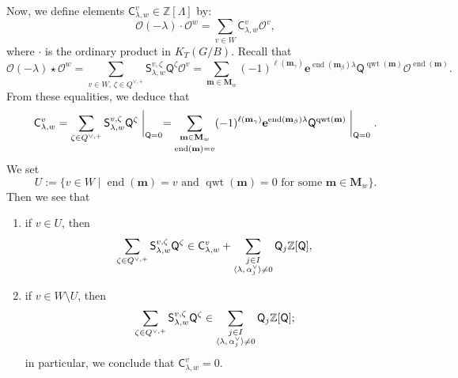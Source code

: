 \documentclass[11pt,a4paper,reqno,dvipdfmx]{amsart}
\numberwithin{equation}{section}
\newcommand{\BZ}{\mathbb{Z}}
\newcommand{\CO}{\mathcal{O}}
\newcommand{\sQ}{\mathsf{Q}}
\newcommand{\sS}{\mathsf{S}}
\newcommand{\sC}{\mathsf{C}}
\newcommand{\be}{\mathbf{e}}
\newcommand{\bm}{\mathbf{m}}
\newcommand{\bM}{\mathbf{M}}
\DeclareMathOperator{\qwt}{qwt}
\DeclareMathOperator{\ed}{end}
\newcommand{\pair}[2]{\langle #1,\,#2 \rangle}
\theoremstyle{plain}
\theoremstyle{definition}
\theoremstyle{remark}
\begin{document}
Now, we define elements $\sC_{\lambda,w}^{v} \in \BZ[\Lambda]$ by: 
%
\begin{equation}
\CO(- \lambda) \cdot \CO^{w} = 
\sum_{v \in W} \sC_{\lambda,w}^{v} \CO^{v},
\end{equation}
%
where $\cdot$ is the ordinary product in $K_{T}(G/B)$. 
Recall that 
%
\begin{equation*}
\CO(- \lambda) \star \CO^{w} = \sum_{v \in W,\,\zeta \in Q^{\vee,+} }
\sS_{\lambda,w}^{v,\zeta} \sQ^{\zeta} \CO^{v} = 
\sum_{\bm \in \bM_{w}}
  (-1)^{\ell(\bm_{\gamma})} \be^{ \ed(\bm_{\beta}) \lambda }
  \sQ^{\qwt(\bm)} \CO^{ \ed(\bm) }. 
\end{equation*}
%
From these equalities, we deduce that 
%
\begin{equation*}
\sC_{\lambda,w}^{v} = \sum_{\zeta \in Q^{\vee,+}}
\sS_{\lambda,w}^{v,\zeta} \sQ^{\zeta} \biggm|_{\sQ=0} = 
\sum_{ \begin{subarray}{c} \bm \in \bM_{w} \\[1mm] \ed(\bm) = v \end{subarray} }
  (-1)^{\ell(\bm_{\gamma})} \be^{ \ed(\bm_{\beta}) \lambda }
  \sQ^{\qwt(\bm)} \biggm|_{\sQ=0}. 
\end{equation*}
%
We set 
%
\begin{equation}
U:=\bigl\{ v \in W \mid 
 \text{$\ed(\bm) = v$ and $\qwt(\bm)=0$ for some $\bm \in \bM_{w}$} \bigr\}.
\end{equation}
%
Then we see that 
%
\begin{enumerate}
\item[(a)] if $v \in U$, then 
%
\begin{equation} \label{eq:ca}
\sum_{\zeta \in Q^{\vee,+}}
\sS_{\lambda,w}^{v,\zeta} \sQ^{\zeta}  \in 
\sC_{\lambda,w}^{v} + \sum_{ 
 \begin{subarray}{c} j \in I \\ \pair{\lambda}{\alpha_{j}^{\vee}} \ne 0 \end{subarray} }
 \sQ_{j} \BZ[\sQ], 
\end{equation}

\item[(b)] if $v \in W \setminus U$, then 
%
\begin{equation} \label{eq:cb}
\sum_{\zeta \in Q^{\vee,+}}
\sS_{\lambda,w}^{v,\zeta} \sQ^{\zeta}  \in \sum_{ 
 \begin{subarray}{c} j \in I \\ \pair{\lambda}{\alpha_{j}^{\vee}} \ne 0 \end{subarray} }
 \sQ_{j} \BZ[\sQ];
\end{equation}
%
in particular, we conclude that $\sC_{\lambda,w}^{v} = 0$. 
\end{enumerate}
\end{document}
